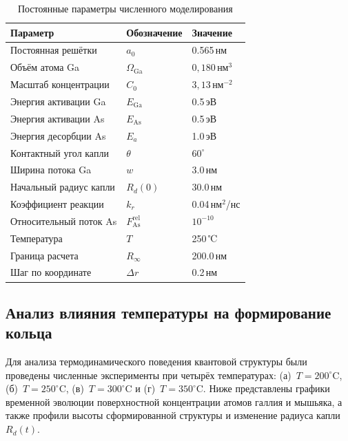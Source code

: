 \documentclass[14pt,oneside]{extarticle}
\begin{document}
\begin{table}[H]
    \centering
    \caption{Постоянные параметры численного моделирования}
    \label{tab:params-fixed}
    \small %
    \begin{tabular}{|l|l|l|}
    \hline
    \textbf{Параметр} & \textbf{Обозначение} & \textbf{Значение} \\ \hline
    Постоянная решётки & $a_0$ & 0.565\,нм \\ \hline
    Объём атома Ga & $\Omega_{\text{Ga}}$ &  $0{,}180\,\text{нм}^3$ \\ \hline
    Масштаб концентрации & $C_0$ & $ 3{,}13\,\text{нм}^{-2}$ \\ \hline
    Энергия активации Ga & $E_{\text{Ga}}$ & 0.5\,эВ \\ \hline
    Энергия активации As & $E_{\text{As}}$ & 0.5\,эВ \\ \hline
    Энергия десорбции As & $E_a$ & 1.0\,эВ \\ \hline
    Контактный угол капли & $\theta$ & $60^\circ$ \\ \hline
    Ширина потока Ga & $w$ & 3.0\,нм \\ \hline
    Начальный радиус капли & $R_d(0)$ & 30.0\,нм \\ \hline
    Коэффициент реакции & $k_r$ & 0.04\,нм$^2$/нс \\ \hline
    Относительный поток As & $F_{\text{As}}^{\text{rel}}$ & $10^{-10}$ \\ \hline
    Температура & $T$ & 250\,℃ \\ \hline 
    Граница расчета & $R_\infty$ & 200.0\,нм \\ \hline
    Шаг по координате & $\Delta r$ & 0.2\,нм \\ \hline
    \end{tabular}
\end{table}  

\subsection{Анализ влияния температуры на формирование кольца}

Для анализа термодинамического поведения квантовой структуры были\\
проведены численные эксперименты при четырёх температурах: (а)~$T = 200^\circ$C,\\ 
(б)~$T = 250^\circ$C, (в)~$T = 300^\circ$C и (г)~$T = 350^\circ$C. Ниже представлены графики временной эволюции поверхностной концентрации атомов галлия и мышьяка, а также профили высоты сформированной структуры и изменение радиуса капли $R_d(t)$.
\end{document}
